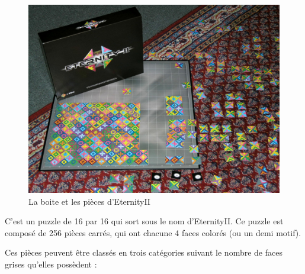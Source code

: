 	\begin{figure}[H]
		\includegraphics[width=\linewidth]{images/eternity_2.jpg}
		\caption{La boite et les pièces d'EternityII}
		\label{fig:eternity_2}
	\end{figure}
	
	C'est un puzzle de 16 par 16 qui sort sous le nom d'EternityII. Ce puzzle est composé de 256 pièces carrés, qui ont chacune 4 faces colorés (ou un demi motif).
	
	Ces pièces peuvent être classés en trois catégories suivant le nombre de faces grises qu'elles possèdent :
	
